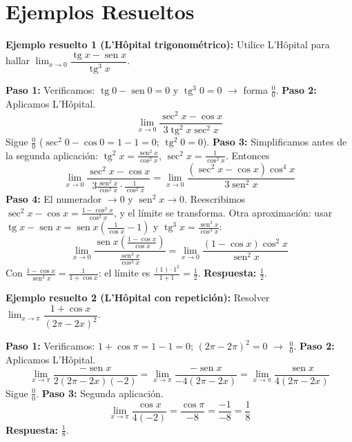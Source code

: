 \documentclass[12pt, letterpaper]{article}
\begin{document}
\newpage
\section{Ejemplos Resueltos}

\noindent\textbf{Ejemplo resuelto 1 (L'Hôpital trigonométrico):} Utilice L'Hôpital para hallar $\lim_{x\to0}\dfrac{\operatorname{tg}x - \operatorname{sen}x}{\operatorname{tg}^3 x}$.

\begin{cuadrosolucion}
  \textbf{Paso 1:} Verificamos: $\operatorname{tg}0 - \operatorname{sen}0 = 0$ y $\operatorname{tg}^3 0 = 0$ $\to$ forma $\frac{0}{0}$.
  \textbf{Paso 2:} Aplicamos L'Hôpital.
  \[
    \lim_{x\to0}\frac{\sec^2 x - \cos x}{3\operatorname{tg}^2 x\sec^2 x}
  \]
  Sigue $\frac{0}{0}$ ($\sec^2 0 - \cos 0 = 1 - 1 = 0$; $\operatorname{tg}^2 0 = 0$).
  \textbf{Paso 3:} Simplificamos antes de la segunda aplicación: $\operatorname{tg}^2 x = \frac{\operatorname{sen}^2 x}{\cos^2 x}$, $\sec^2 x = \frac{1}{\cos^2 x}$. Entonces
  \[
    \lim_{x\to0}\frac{\sec^2 x - \cos x}{3\frac{\operatorname{sen}^2 x}{\cos^2 x}\cdot\frac{1}{\cos^2 x}}
    = \lim_{x\to0}\frac{(\sec^2 x - \cos x)\cos^4 x}{3\operatorname{sen}^2 x}
  \]
  \textbf{Paso 4:} El numerador $\to 0$ y $\operatorname{sen}^2 x \to 0$. Reescribimos $\sec^2 x - \cos x = \frac{1 - \cos^3 x}{\cos^2 x}$, y el límite se transforma. Otra aproximación: usar $\operatorname{tg}x - \operatorname{sen}x = \operatorname{sen}x\left(\frac{1}{\cos x}-1\right)$ y $\operatorname{tg}^3 x = \frac{\operatorname{sen}^3 x}{\cos^3 x}$:
  \[
    \lim_{x\to0}\frac{\operatorname{sen}x\left(\frac{1-\cos x}{\cos x}\right)}{\frac{\operatorname{sen}^3 x}{\cos^3 x}}
    = \lim_{x\to0}\frac{(1-\cos x)\cos^2 x}{\operatorname{sen}^2 x}
  \]
  Con $\frac{1-\cos x}{\operatorname{sen}^2 x} = \frac{1}{1+\cos x}$: el límite es $\frac{(1)\cdot 1^2}{1+1} = \frac{1}{2}$. \textbf{Respuesta:} $\frac{1}{2}$.
\end{cuadrosolucion}

\noindent\textbf{Ejemplo resuelto 2 (L'Hôpital con repetición):} Resolver $\lim_{x\to\pi}\dfrac{1+\cos x}{(2\pi - 2x)^2}$.

\begin{cuadrosolucion}
  \textbf{Paso 1:} Verificamos: $1 + \cos\pi = 1 - 1 = 0$; $(2\pi - 2\pi)^2 = 0$ $\to$ $\frac{0}{0}$.
  \textbf{Paso 2:} Aplicamos L'Hôpital.
  \[
    \lim_{x\to\pi}\frac{-\operatorname{sen} x}{2(2\pi-2x)(-2)} = \lim_{x\to\pi}\frac{-\operatorname{sen} x}{-4(2\pi-2x)} = \lim_{x\to\pi}\frac{\operatorname{sen} x}{4(2\pi-2x)}
  \]
  Sigue $\frac{0}{0}$.
  \textbf{Paso 3:} Segunda aplicación.
  \[
    \lim_{x\to\pi}\frac{\cos x}{4(-2)} = \frac{\cos\pi}{-8} = \frac{-1}{-8} = \frac{1}{8}
  \]
  \textbf{Respuesta:} $\frac{1}{8}$.
\end{cuadrosolucion}
\end{document}

